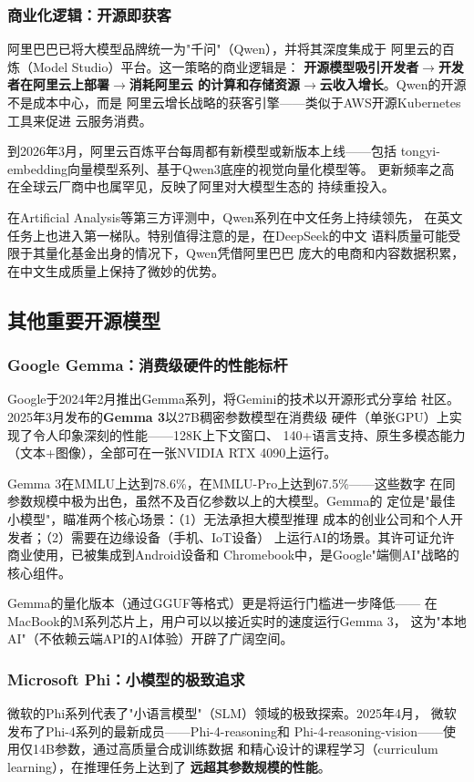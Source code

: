 \subsubsection{商业化逻辑：开源即获客}
阿里巴巴已将大模型品牌统一为"千问"（Qwen），并将其深度集成于
阿里云的百炼（Model Studio）平台。这一策略的商业逻辑是：
\textbf{开源模型吸引开发者$\to$开发者在阿里云上部署$\to$消耗阿里云
的计算和存储资源$\to$云收入增长}。Qwen的开源不是成本中心，而是
阿里云增长战略的获客引擎——类似于AWS开源Kubernetes工具来促进
云服务消费。

到2026年3月，阿里云百炼平台每周都有新模型或新版本上线——包括
tongyi-embedding向量模型系列、基于Qwen3底座的视觉向量化模型等。
更新频率之高在全球云厂商中也属罕见，反映了阿里对大模型生态的
持续重投入。

在Artificial Analysis等第三方评测中，Qwen系列在中文任务上持续领先，
在英文任务上也进入第一梯队。特别值得注意的是，在DeepSeek的中文
语料质量可能受限于其量化基金出身的情况下，Qwen凭借阿里巴巴
庞大的电商和内容数据积累，在中文生成质量上保持了微妙的优势。

\subsection{其他重要开源模型}
\label{subsec:other-opensource}

\subsubsection{Google Gemma：消费级硬件的性能标杆}
Google于2024年2月推出Gemma系列，将Gemini的技术以开源形式分享给
社区。2025年3月发布的\textbf{Gemma 3}以27B稠密参数模型在消费级
硬件（单张GPU）上实现了令人印象深刻的性能——128K上下文窗口、
140+语言支持、原生多模态能力（文本+图像），全部可在一张NVIDIA
RTX 4090上运行。

Gemma 3在MMLU上达到78.6\%，在MMLU-Pro上达到67.5\%——这些数字
在同参数规模中极为出色，虽然不及百亿参数以上的大模型。Gemma的
定位是"最佳小模型"，瞄准两个核心场景：（1）无法承担大模型推理
成本的创业公司和个人开发者；（2）需要在边缘设备（手机、IoT设备）
上运行AI的场景。其许可证允许商业使用，已被集成到Android设备和
Chromebook中，是Google"端侧AI"战略的核心组件。

Gemma的量化版本（通过GGUF等格式）更是将运行门槛进一步降低——
在MacBook的M系列芯片上，用户可以以接近实时的速度运行Gemma 3，
这为"本地AI"（不依赖云端API的AI体验）开辟了广阔空间。

\subsubsection{Microsoft Phi：小模型的极致追求}
微软的Phi系列代表了"小语言模型"（SLM）领域的极致探索。2025年4月，
微软发布了Phi-4系列的最新成员——Phi-4-reasoning和
Phi-4-reasoning-vision——使用仅14B参数，通过高质量合成训练数据
和精心设计的课程学习（curriculum learning），在推理任务上达到了
\textbf{远超其参数规模的性能}。

